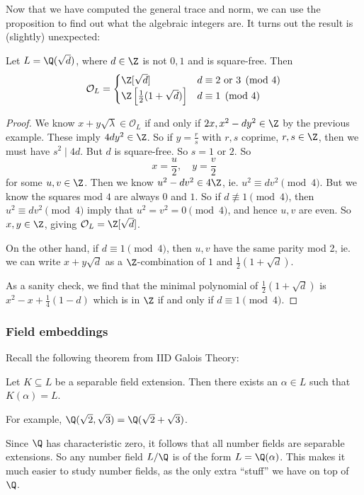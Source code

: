 \documentclass[a4paper]{article}
\begin{document}
Now that we have computed the general trace and norm, we can use the proposition to find out what the algebraic integers are. It turns out the result is (slightly) unexpected:
\begin{lemma}
  Let $L = \Q(\sqrt{d})$, where $d \in \Z$ is not $0, 1$ and is square-free. Then
  \[
    \mathcal{O}_L =
    \begin{cases}
      \Z[\sqrt{d}] & d \equiv 2 \text{ or }3\pmod 4\\
      \Z\left[\frac{1}{2}(1 + \sqrt{d})\right] & d \equiv 1 \pmod 4
    \end{cases}
  \]
\end{lemma}

\begin{proof}
  We know $x + y \sqrt{\lambda} \in \mathcal{O}_L$ if and only if $2x, x^2 - dy^2 \in \Z$ by the previous example. These imply $4dy^2 \in \Z$. So if $y = \frac{r}{s}$ with $r, s$ coprime, $r, s \in \Z$, then we must have $s^2 \mid 4d$. But $d$ is square-free. So $s = 1$ or $2$. So
  \[
    x = \frac{u}{2},\quad y = \frac{v}{2}
  \]
  for some $u, v \in \Z$. Then we know $u^2 - dv^2 \in 4\Z$, ie. $u^2 \equiv dv^2 \pmod 4$. But we know the squares mod $4$ are always $0$ and $1$. So if $d \not\equiv 1 \pmod 4$, then $u^2 \equiv dv^2\pmod 4$ imply that $u^2 = v^2 = 0\pmod 4$, and hence $u, v$ are even. So $x, y \in \Z$, giving $\mathcal{O}_L = \Z[\sqrt{d}]$.

  On the other hand, if $d \equiv 1\pmod 4$, then $u, v$ have the same parity mod 2, ie. we can write $x + y\sqrt{d}$ as a $\Z$-combination of $1$ and $\frac{1}{2}(1 + \sqrt{d})$.

  As a sanity check, we find that the minimal polynomial of $\frac{1}{2}(1 + \sqrt{d})$ is $x^2 - x + \frac{1}{4}(1 - d)$ which is in $\Z$ if and only if $d \equiv 1 \pmod 4$.
\end{proof}

\subsubsection*{Field embeddings}
Recall the following theorem from IID Galois Theory:
\begin{thm}
  Let $K \subseteq L$ be a separable field extension. Then there exists an $\alpha \in L$ such that $K(\alpha) = L$.
\end{thm}
For example, $\Q(\sqrt{2}, \sqrt{3}) = \Q(\sqrt{2} + \sqrt{3})$.

Since $\Q$ has characteristic zero, it follows that all number fields are separable extensions. So any number field $L/\Q$ is of the form $L = \Q(\alpha)$. This makes it much easier to study number fields, as the only extra ``stuff'' we have on top of $\Q$.
\end{document}
